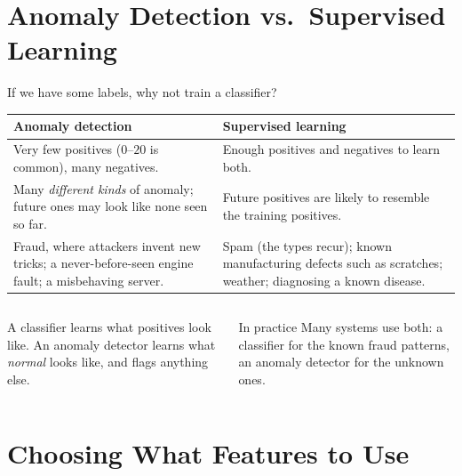 \documentclass[aspectratio=169,10pt]{beamer}
\begin{document}
\section{Anomaly Detection vs.\ Supervised Learning}

\begin{frame}{If we have some labels, why not train a classifier?}
  \footnotesize
  \renewcommand{\arraystretch}{1.35}
  \begin{tabular}{@{}L{6.6cm}L{6.8cm}@{}}
    \toprule
    \textbf{Anomaly detection} & \textbf{Supervised learning}\\
    \midrule
    Very few positives ($0$--$20$ is common), many negatives.
      & Enough positives and negatives to learn both.\\
    Many \emph{different kinds} of anomaly; future ones may look like none seen so far.
      & Future positives are likely to resemble the training positives.\\
    Fraud, where attackers invent new tricks; a never-before-seen engine fault; a
    misbehaving server.
      & Spam (the types recur); known manufacturing defects such as scratches; weather;
      diagnosing a known disease.\\
    \bottomrule
  \end{tabular}
  \vspace{3mm}
  \begin{columns}[T,onlytextwidth]
    \begin{column}{0.5\textwidth}
      \begin{keyidea}
        A classifier learns what positives look like. An anomaly detector learns what
        \emph{normal} looks like, and flags anything else.
      \end{keyidea}
    \end{column}
    \begin{column}{0.46\textwidth}
      \begin{block}{In practice}
        Many systems use both: a classifier for the known fraud patterns, an anomaly
        detector for the unknown ones.
      \end{block}
    \end{column}
  \end{columns}
\end{frame}

\section{Choosing What Features to Use}
\end{document}
